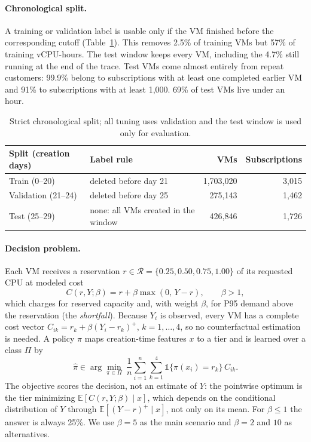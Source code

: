 \documentclass[10pt]{article}
\newcommand{\Ex}{\mathbb{E}}
\begin{document}
\paragraph{Chronological split.} A training or validation label is usable only if the VM finished before the corresponding cutoff (Table~\ref{tab:split}). This removes 2.5\% of training VMs but 57\% of training vCPU-hours. The test window keeps every VM, including the 4.7\% still running at the end of the trace. Test VMs come almost entirely from repeat customers: 99.9\% belong to subscriptions with at least one completed earlier VM and 91\% to subscriptions with at least 1,000. 69\% of test VMs live under an hour.

\begin{table}[h]
\centering\small
\caption{Strict chronological split; all tuning uses validation and the test window is used only for evaluation.}
\label{tab:split}
\begin{tabular}{llrr}
\toprule
Split (creation days) & Label rule & VMs & Subscriptions \\
\midrule
Train (0--20) & deleted before day 21 & 1,703,020 & 3,015 \\
Validation (21--24) & deleted before day 25 & 275,143 & 1,462 \\
Test (25--29) & none: all VMs created in the window & 426,846 & 1,726 \\
\bottomrule
\end{tabular}
\end{table}

\paragraph{Decision problem.} Each VM receives a reservation $r\in\mathcal{R}=\{0.25,0.50,0.75,1.00\}$ of its requested CPU at modeled cost
\begin{equation}
C(r,Y;\beta)=r+\beta\max(0,\,Y-r),\qquad \beta>1,
\label{eq:cost}
\end{equation}
which charges for reserved capacity and, with weight $\beta$, for P95 demand above the reservation (the \emph{shortfall}). Because $Y_i$ is observed, every VM has a complete cost vector $C_{ik}=r_k+\beta(Y_i-r_k)^+$, $k=1,\dots,4$, so no counterfactual estimation is needed. A policy $\pi$ maps creation-time features $x$ to a tier and is learned over a class $\Pi$ by
\begin{equation}
\hat\pi\in\arg\min_{\pi\in\Pi}\ \frac{1}{n}\sum_{i=1}^n\sum_{k=1}^4 \mathbb{1}\{\pi(x_i)=r_k\}\,C_{ik}.
\label{eq:erm}
\end{equation}
The objective scores the decision, not an estimate of $Y$: the pointwise optimum is the tier minimizing $\Ex[C(r,Y;\beta)\mid x]$, which depends on the conditional distribution of $Y$ through $\Ex[(Y-r)^+\mid x]$, not only on its mean. For $\beta\le1$ the answer is always 25\%. We use $\beta=5$ as the main scenario and $\beta=2$ and $10$ as alternatives.
\end{document}
